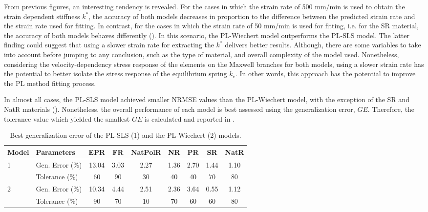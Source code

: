 From previous figures, an interesting tendency is revealed. For the cases in which the strain rate of 500 mm/min is used to obtain the strain dependent stiffness $k^*$, the accuracy of both models decreases in proportion to the difference between the predicted strain rate and the strain rate used for fitting. In contrast, for the cases in which the strain rate of 50 mm/min is used for fitting, i.e. for the SR material, the accuracy of both models behaves differently (). In this scenario, the PL-Wiechert model outperforms the PL-SLS model. The latter finding could suggest that using a slower strain rate for extracting the $k^*$ delivers better results. Although, there are some variables to take into account before jumping to any conclusion, such as the type of material, and overall complexity of the model used. Nonetheless, considering the velocity-dependency stress response of the elements on the Maxwell branches for both models, using a slower strain rate has the potential to better isolate the stress response of the equilibrium spring $k_e$. In other words, this approach has the potential to improve the PL method fitting process.

In almost all cases, the PL-SLS model achieved smaller NRMSE values than the PL-Wiechert model, with the exception of the SR and NatR materials (). Nonetheless, the overall performance of each model is best assessed using the generalization error, $GE$. Therefore, the tolerance value which yielded the smallest $GE$ is calculated and reported in .

\begin{table*}[htbp!]
	\centering
	\caption{Best generalization error of the PL-SLS (1) and the PL-Wiechert (2) models.}
	\label{tbl:GenError}
	\begin{tabular}{llccccccc} \toprule
		Model 					& Parameters 		& EPR	& FR 	& NatPolR & NR & PR & SR & NatR \\
		\hline
		\multirow{2}{*}{1}  & Gen. Error (\%)		& 13.04	& 3.03 	& 2.27 	& 1.36 & 2.70 & 1.44 & 1.10 \\
		& Tolerance (\%)							& 60	& 90 	& 30 	& 40 	& 40 & 70 & 80 \\
		\hline 
		\multirow{2}{*}{2}  & Gen. Error (\%)		& 10.34	& 4.44 	& 2.51 	& 2.36 & 3.64 & 0.55 & 1.12\\		
		& Tolerance	(\%)							& 90	& 70 	& 10 	& 70 	& 60 & 60 & 80 \\		
		\bottomrule
	\end{tabular}
\end{table*}

